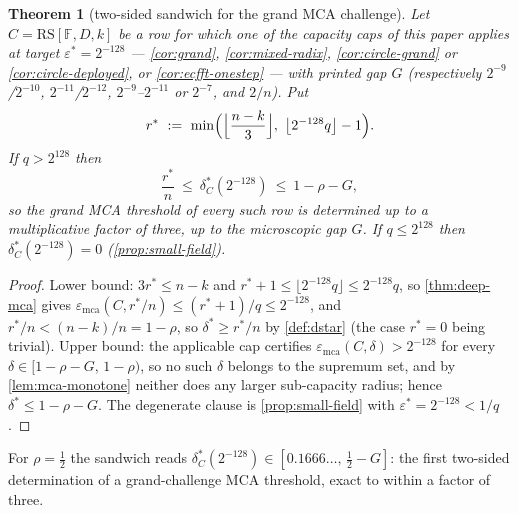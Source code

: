 \documentclass[11pt]{article}
\newtheorem{theorem}{Theorem}[section]
\theoremstyle{definition}
\theoremstyle{remark}
\newcommand{\F}{\mathbb{F}}
\newcommand{\RS}{\mathrm{RS}}
\newcommand{\emca}{\varepsilon_{\mathrm{mca}}}
\begin{document}
\begin{theorem}[two-sided sandwich for the grand MCA challenge]\label{thm:sandwich}
Let $C=\RS[\F,D,k]$ be a row for which one of the capacity caps of this paper applies at target $\varepsilon^*=2^{-128}$ --- \cref{cor:grand}, \cref{cor:mixed-radix}, \cref{cor:circle-grand} or \cref{cor:circle-deployed}, or \cref{cor:ecfft-onestep} --- with printed gap $G$ \textup(respectively $2^{-9}$/$2^{-10}$, $2^{-11}$/$2^{-12}$, $2^{-9}$--$2^{-11}$ or $2^{-7}$, and $2/n$\textup). Put
\[
r^*\ :=\ \min\Bigl(\Bigl\lfloor\frac{n-k}3\Bigr\rfloor,\ \bigl\lfloor2^{-128}q\bigr\rfloor-1\Bigr).
\]
If $q>2^{128}$ then
\[
\frac{r^*}n\ \le\ \delta^*_C(2^{-128})\ \le\ 1-\rho-G ,
\]
so the grand MCA threshold of every such row is determined up to a multiplicative factor of three, up to the microscopic gap $G$. If $q\le2^{128}$ then $\delta^*_C(2^{-128})=0$ \textup(\cref{prop:small-field}\textup).
\end{theorem}

\begin{proof}
Lower bound: $3r^*\le n-k$ and $r^*+1\le\lfloor2^{-128}q\rfloor\le2^{-128}q$, so \cref{thm:deep-mca} gives $\emca(C,r^*/n)\le(r^*+1)/q\le2^{-128}$, and $r^*/n<(n-k)/n=1-\rho$, so $\delta^*\ge r^*/n$ by \cref{def:dstar} (the case $r^*=0$ being trivial). Upper bound: the applicable cap certifies $\emca(C,\delta)>2^{-128}$ for every $\delta\in[1-\rho-G,\,1-\rho)$, so no such $\delta$ belongs to the supremum set, and by \cref{lem:mca-monotone} neither does any larger sub-capacity radius; hence $\delta^*\le1-\rho-G$. The degenerate clause is \cref{prop:small-field} with $\varepsilon^*=2^{-128}<1/q$.
\end{proof}

For $\rho=\tfrac12$ the sandwich reads $\delta^*_C(2^{-128})\in[0.1666\ldots,\,\tfrac12-G]$: the first two-sided determination of a grand-challenge MCA threshold, exact to within a factor of three.
\end{document}

